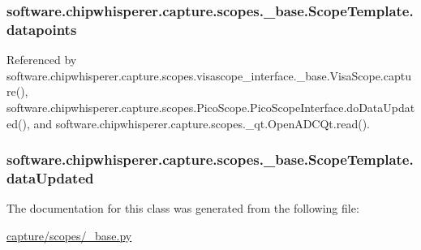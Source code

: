 \subsubsection[{datapoints}]{\setlength{\rightskip}{0pt plus 5cm}software.\+chipwhisperer.\+capture.\+scopes.\+\_\+base.\+Scope\+Template.\+datapoints}\label{classsoftware_1_1chipwhisperer_1_1capture_1_1scopes_1_1__base_1_1ScopeTemplate_a82148d6b89edf8ca5194cfe85256a972}


Referenced by software.\+chipwhisperer.\+capture.\+scopes.\+visascope\+\_\+interface.\+\_\+base.\+Visa\+Scope.\+capture(), software.\+chipwhisperer.\+capture.\+scopes.\+Pico\+Scope.\+Pico\+Scope\+Interface.\+do\+Data\+Updated(), and software.\+chipwhisperer.\+capture.\+scopes.\+\_\+qt.\+Open\+A\+D\+C\+Qt.\+read().

\hypertarget{classsoftware_1_1chipwhisperer_1_1capture_1_1scopes_1_1__base_1_1ScopeTemplate_a08023f13a2289e2ac5aa4177027ea12f}{}
\subsubsection[{data\+Updated}]{\setlength{\rightskip}{0pt plus 5cm}software.\+chipwhisperer.\+capture.\+scopes.\+\_\+base.\+Scope\+Template.\+data\+Updated}\label{classsoftware_1_1chipwhisperer_1_1capture_1_1scopes_1_1__base_1_1ScopeTemplate_a08023f13a2289e2ac5aa4177027ea12f}


The documentation for this class was generated from the following file\+:\begin{DoxyCompactItemize}
\item 
\hyperlink{capture_2scopes_2__base_8py}{capture/scopes/\+\_\+base.\+py}\end{DoxyCompactItemize}
